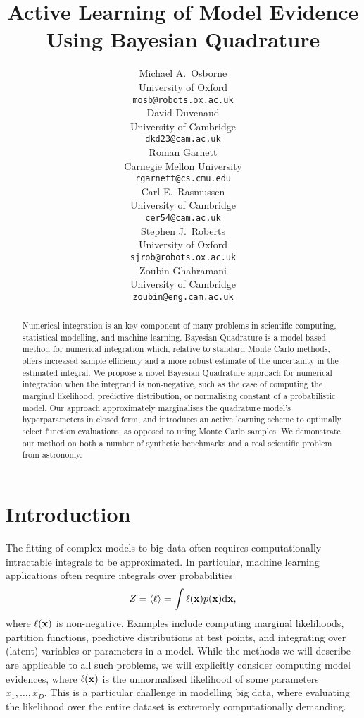 \documentclass{article} %
\title{Active Learning of Model Evidence \\Using Bayesian Quadrature }
\author{
Michael A.~Osborne \\
University of Oxford\\
\texttt{mosb@robots.ox.ac.uk} \\
\And
David Duvenaud \\
University of Cambridge \\
\texttt{dkd23@cam.ac.uk} \\
\And
Roman Garnett \\
Carnegie Mellon University\\
\texttt{rgarnett@cs.cmu.edu} \\
\AND
Carl E.~Rasmussen \\
University of Cambridge \\
\texttt{cer54@cam.ac.uk} \\
\And
Stephen J.~Roberts \\
University of Oxford \\
\texttt{sjrob@robots.ox.ac.uk} \\
\And
Zoubin Ghahramani \\
University of Cambridge \\
\texttt{zoubin@eng.cam.ac.uk} \\
}
\begin{document}
 

\maketitle

\begin{abstract} 
Numerical integration is an key component of many problems in scientific computing, statistical modelling, and machine learning. Bayesian Quadrature is a model-based method for numerical integration which, relative to standard Monte Carlo methods, offers increased sample efficiency and a more robust estimate of the uncertainty in the estimated integral. We propose a novel Bayesian Quadrature approach for numerical integration when the integrand is non-negative, such as the case of computing the marginal likelihood, predictive distribution, or normalising constant of a probabilistic model. Our approach approximately marginalises the quadrature model's hyperparameters in closed form, and introduces an active learning scheme to optimally select function evaluations, as opposed to using Monte Carlo samples. We demonstrate our method on both a number of synthetic benchmarks and a real scientific problem from astronomy.
\end{abstract} 

\section{Introduction}

The fitting of complex models to big data often requires computationally intractable integrals to be approximated. In particular, machine learning applications often require integrals over probabilities
\begin{equation}\label{eq:ev}
Z = \inty{\lfn} = \int \lfn(\vlfv) p(\vlfv) \ud\vlfv,
\end{equation}
where $\ell(\vlfv)$ is non-negative.  Examples include computing marginal likelihoods, partition functions, predictive distributions at test points, and integrating over (latent) variables or parameters in a model. While the methods we will describe are applicable to all such problems, we will explicitly consider computing model evidences, where $\ell(\vlfv)$ is the unnormalised likelihood of some parameters $x_1, \dots, x_D$. This is a particular challenge in modelling big data, where evaluating the likelihood over the entire dataset is extremely computationally demanding. 

\end{document}
